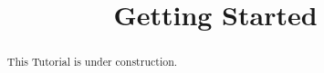 \documentclass[justified]{tufte-handout}
\title{Getting Started}
\begin{document}
\maketitle

\begin{abstract}
\noindent
This Tutorial is under construction.
\end{abstract}
\end{document}
